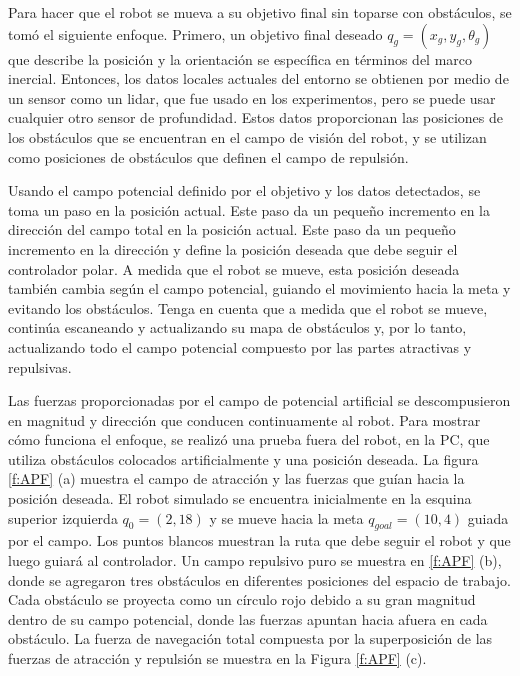 Para hacer que el robot se mueva a su objetivo final sin toparse con obstáculos, se 
tomó el siguiente enfoque. Primero, un objetivo final deseado $q_{g} =(x_{g}, y_{g}, 
\theta_{g})$ que describe la posición y la orientación se específica en términos del 
marco inercial. Entonces, los datos locales actuales del entorno se obtienen por medio 
de un sensor como un lidar, que fue usado en los experimentos, pero se puede usar cualquier 
otro sensor de profundidad. Estos datos proporcionan las posiciones de los obstáculos que 
se encuentran en el campo de visión del robot, y se utilizan como posiciones de obstáculos 
que definen el campo de repulsión.

Usando el campo potencial definido por el objetivo y los datos detectados, se toma un paso 
en la posición actual. Este paso da un pequeño incremento en la dirección del campo total 
en la posición actual. Este paso da un pequeño incremento en la dirección y define la 
posición deseada que debe seguir el controlador polar. A medida que el robot se mueve, esta 
posición deseada también cambia según el campo potencial, guiando el movimiento hacia la meta 
y evitando los obstáculos. Tenga en cuenta que a medida que el robot se mueve, continúa 
escaneando y actualizando su mapa de obstáculos y, por lo tanto, actualizando todo el campo 
potencial compuesto por las partes atractivas y repulsivas.

Las fuerzas proporcionadas por el campo de potencial artificial se descompusieron en 
magnitud y dirección que conducen continuamente al robot. Para mostrar cómo funciona el 
enfoque, se realizó una prueba fuera del robot, en la PC, que utiliza obstáculos 
colocados artificialmente y una posición deseada. La figura \ref{f:APF} (a) muestra el campo 
de atracción y las fuerzas que guían hacia la posición deseada. El robot simulado se 
encuentra inicialmente en la esquina superior izquierda $q_{0} = (2,18)$ y se mueve hacia 
la meta $q_{goal} = (10,4)$ guiada por el campo. Los puntos blancos muestran la ruta que debe 
seguir el robot y que luego guiará al controlador. Un campo repulsivo puro se muestra en 
\ref{f:APF} (b), donde se agregaron tres obstáculos en diferentes posiciones del espacio de 
trabajo. Cada obstáculo se proyecta como un círculo rojo debido a su gran magnitud dentro de 
su campo potencial, donde las fuerzas apuntan hacia afuera en cada obstáculo. La fuerza de 
navegación total compuesta por la superposición de las fuerzas de atracción y repulsión se 
muestra en la Figura \ref{f:APF} (c).

